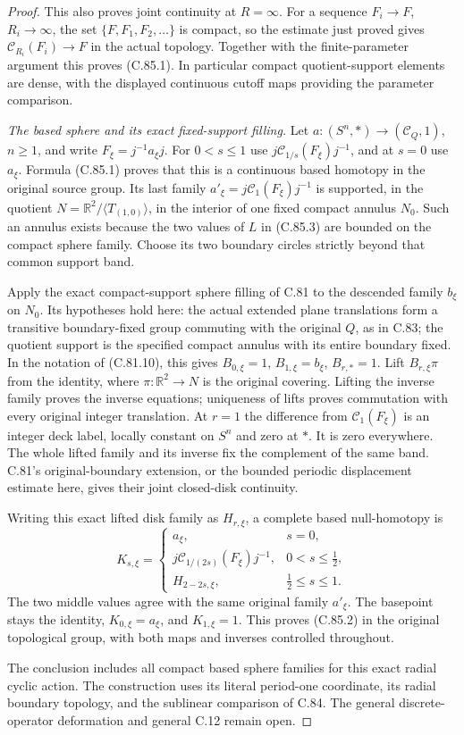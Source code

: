 \begin{proof}
This also proves joint continuity
at $R=\infty$. For a sequence
$F_i\to F$, $R_i\to\infty$, the set
$\{F,F_1,F_2,\ldots\}$ is compact,
so the estimate just proved gives
$\mathcal C_{R_i}(F_i)\to F$ in the
actual topology. Together with the
finite-parameter argument this proves
(C.85.1). In particular compact
quotient-support elements are dense,
with the displayed continuous cutoff
maps providing the parameter comparison.

\emph{The based sphere and its exact fixed-support filling.}
Let $a:(S^n,*)\to(\mathscr C_Q,1)$,
$n\geq1$, and write $F_\xi=j^{-1}a_\xi j$.
For $0<s\leq1$ use
$j\mathcal C_{1/s}(F_\xi)j^{-1}$,
and at $s=0$ use $a_\xi$.
Formula (C.85.1) proves that this is
a continuous based homotopy in the
original source group. Its last
family $a'_\xi=j\mathcal C_1(F_\xi)j^{-1}$
is supported, in the quotient
$N=\mathbb R^2/\langle T_{(1,0)}\rangle$,
in the interior of one fixed compact
annulus $N_0$. Such an annulus exists
because the two values of $L$ in
(C.85.3) are bounded on the compact
sphere family. Choose its two boundary
circles strictly beyond that common
support band.

Apply the exact compact-support
sphere filling of C.81 to the
descended family $b_\xi$ on $N_0$.
Its hypotheses hold here: the actual
extended plane translations form a
transitive boundary-fixed group
commuting with the original $Q$, as
in C.83; the quotient support is the
specified compact annulus with its
entire boundary fixed. In the notation
of (C.81.10), this gives
$B_{0,\xi}=1$, $B_{1,\xi}=b_\xi$,
$B_{r,*}=1$. Lift $B_{r,\xi}\pi$ from
the identity, where
$\pi:\mathbb R^2\to N$ is the original
covering. Lifting the inverse family
proves the inverse equations; uniqueness
of lifts proves commutation with every
original integer translation.
At $r=1$ the difference from
$\mathcal C_1(F_\xi)$ is an integer
deck label, locally constant on $S^n$
and zero at $*$. It is zero everywhere.
The whole lifted family and its inverse
fix the complement of the same band.
C.81's original-boundary extension,
or the bounded periodic displacement
estimate here, gives their joint
closed-disk continuity.

Writing this exact lifted disk family
as $H_{r,\xi}$, a complete based
null-homotopy is
\[
 K_{s,\xi}=
 \begin{cases}
   a_\xi,&s=0,\\
   j\mathcal C_{1/(2s)}(F_\xi)j^{-1},&0<s\leq\tfrac12,\\
   H_{2-2s,\xi},&\tfrac12\leq s\leq1.
 \end{cases}                                                     \tag{C.85.18}
\]
The two middle values agree with the
same original family $a'_\xi$.
The basepoint stays the identity,
$K_{0,\xi}=a_\xi$, and $K_{1,\xi}=1$.
This proves (C.85.2) in the original
topological group, with both maps
and inverses controlled throughout.

The conclusion includes all compact
based sphere families for this exact
radial cyclic action. The construction
uses its literal period-one coordinate,
its radial boundary topology, and the
sublinear comparison of C.84. The
general discrete-operator deformation
and general C.12 remain open.
\end{proof}

